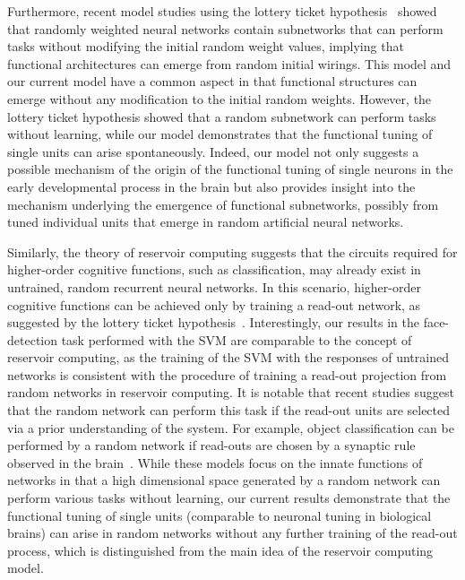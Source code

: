 \documentclass[final,3p,times,twocolumn]{elsarticle}
\begin{document}
Furthermore, recent model studies using the lottery ticket hypothesis~\cite{frankle2019stabilizing,ramanujan2020s} showed that randomly weighted neural networks contain subnetworks that can perform tasks without modifying the initial random weight values,
implying that functional architectures can emerge from random initial wirings.
This model and our current model have a common aspect in that functional structures can emerge without any modification to the initial random weights.
However, the lottery ticket hypothesis showed that a random subnetwork can perform tasks without learning,
while our model demonstrates that the functional tuning of single units can arise spontaneously.
Indeed, our model not only suggests a possible mechanism of the origin of the functional tuning of single neurons in the early developmental process in the brain but also provides insight into the mechanism underlying the emergence of functional subnetworks, 
possibly from tuned individual units that emerge in random artificial neural networks.


Similarly, the theory of reservoir computing suggests that the circuits required for higher-order cognitive functions, such as classification, may already exist in untrained, random recurrent neural networks.
In this scenario, higher-order cognitive functions can be achieved only by training a read-out network, as suggested by the lottery ticket hypothesis~\cite{verstraeten2007experimental,bellec2020solution}.
Interestingly, our results in the face-detection task performed with the SVM are comparable to the concept of reservoir computing, 
as the training of the SVM with the responses of untrained networks is consistent with the procedure of training a read-out projection from random networks in reservoir computing.
It is notable that recent studies suggest that the random network can perform this task if the read-out units are selected via a prior understanding of the system.
For example, object classification can be performed by a random network if read-outs are chosen by a synaptic rule observed in the brain~\cite{weidel2021unsupervised,tetzlaff2013synaptic}.
While these models focus on the innate functions of networks in that a high dimensional space generated by a random network can perform various tasks without learning,
our current results demonstrate that the functional tuning of single units (comparable to neuronal tuning in biological brains) can arise in random networks without any further training of the read-out process, 
which is distinguished from the main idea of the reservoir computing model.
\end{document}
